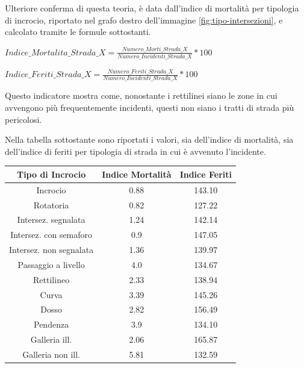 \documentclass[a4paper,12pt]{report}
\begin{document}
Ulteriore conferma di questa teoria, è data dall'indice di mortalità per tipologia di incrocio, 
riportato nel grafo destro dell'immagine \ref{fig:tipo-intersezioni}, e calcolato tramite le 
formule sottostanti. 

\begin{center}
    $Indice\_Mortalita\_Strada\_X = \displaystyle \frac{Numero\_Morti\_Strada\_X}{Numero\_Incidenti\_Strada\_X} * 100$ 
\end{center}

\begin{center}
    $Indice\_Feriti\_Strada\_X = \displaystyle \frac{Numero\_Feriti\_Strada\_X}{Numero\_Incidenti\_Strada\_X} * 100$ 
\end{center}

Questo indicatore mostra come, nonostante i rettilinei siano le zone in cui 
avvengono più frequentemente incidenti, questi non siano i tratti di 
strada più pericolosi. 

Nella tabella sottostante sono riportati i valori, sia dell'indice di mortalità, 
sia dell'indice di feriti per tipologia di strada in cui è avvenuto l'incidente.

\begin{center}
    \def\arraystretch{1.5}%
    \begin{tabular}{ |c|c|c| } 
    \hline
    Tipo di Incrocio & Indice Mortalità & Indice Feriti \\ 
    \hline
    \rowcolor{TableGray}
    Incrocio                & 0.88 & 143.10 \\
    Rotatoria               & 0.82 & 127.22 \\
    \rowcolor{TableGray}
    Intersez. segnalata     & 1.24 & 142.14 \\
    Intersez. con semaforo  & 0.9 & 147.05 \\
    \rowcolor{TableGray}
    Intersez. non segnalata & 1.36 & 139.97\\
    Passaggio a livello     & 4.0 & 134.67\\
    \rowcolor{TableGray}
    Rettilineo              & 2.33 & 138.94\\
    Curva                   & 3.39 & 145.26\\
    \rowcolor{TableGray}
    Dosso                   & 2.82 & 156.49\\
    Pendenza                & 3.9 & 134.10\\
    \rowcolor{TableGray}
    Galleria ill.           & 2.06 & 165.87\\
    Galleria non ill.       & 5.81 & 132.59\\
    \hline
    \end{tabular}
\end{center}
\end{document}
